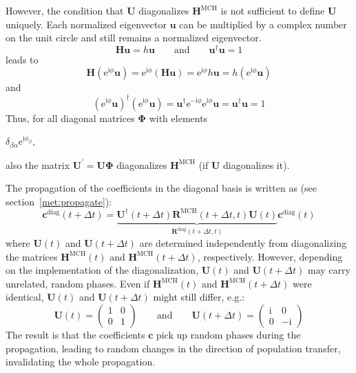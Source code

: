 \documentclass[a4paper,10pt,DIV=15,openany]{scrbook}
\newcommand{\tthdump}[1]{#1}
\newcommand{\E}{\ensuremath{\mathrm{e}}}
\newcommand{\I}{\ensuremath{\mathrm{i}}}
\newcommand{\VEC}[1]{\ensuremath{\mathbf{#1}}}
\begin{document}
However, the condition that $\VEC{U}$ diagonalizes $\VEC{H}^{\text{MCH}}$ is not sufficient to define $\VEC{U}$ uniquely. Each normalized eigenvector $\VEC{u}$ can be multiplied by a complex number on the unit circle and still remains a normalized eigenvector.
\begin{equation}
  \VEC{H}\VEC{u}=h\VEC{u}
  \qquad\text{and}\qquad
  \VEC{u}^\dagger\VEC{u}=1
\end{equation}
leads to
\begin{equation}
  \VEC{H}\left(\E^{\I\phi}\VEC{u}\right)
  =\E^{\I\phi}\left(\VEC{H}\VEC{u}\right)
  =\E^{\I\phi}h\VEC{u}
  =h\left(\E^{\I\phi}\VEC{u}\right)
\end{equation}
and
\begin{equation}
  \left(\E^{\I\phi}\VEC{u}\right)^\dagger\left(\E^{\I\phi}\VEC{u}\right)
  =\VEC{u}^\dagger\E^{-\I\phi}\E^{\I\phi}\VEC{u}
  =\VEC{u}^\dagger\VEC{u}=1
\end{equation}
Thus, for all diagonal matrices $\boldsymbol{\Phi}$ with elements 
\tthdump{
  $\delta_{\beta\alpha}\E^{\I\phi_\beta}$, 
}
also the matrix $\VEC{U}^\prime=\VEC{U}\boldsymbol{\Phi}$ diagonalizes $\VEC{H}^{\text{MCH}}$ (if $\VEC{U}$ diagonalizes it).

The propagation of the coefficients in the diagonal basis is written as (see section~\ref{met:propagate}):
\begin{equation}
  \VEC{c}^{\text{diag}}(t+\Delta t)=\underbrace{\VEC{U}^\dagger(t+\Delta t)\VEC{R}^{\text{MCH}}(t+\Delta t,t)\VEC{U}(t)}_{\VEC{R}^{\text{diag}}(t+\Delta t,t)}\VEC{c}^{\text{diag}}(t)
\end{equation}
where $\VEC{U}(t)$ and $\VEC{U}(t+\Delta t)$ are determined independently from diagonalizing the matrices $\VEC{H}^{\text{MCH}}(t)$ and $\VEC{H}^{\text{MCH}}(t+\Delta t)$, respectively. However, depending on the implementation of the diagonalization, $\VEC{U}(t)$ and $\VEC{U}(t+\Delta t)$ may carry unrelated, random phases. Even if $\VEC{H}^{\text{MCH}}(t)$ and $\VEC{H}^{\text{MCH}}(t+\Delta t)$ were identical, $\VEC{U}(t)$ and $\VEC{U}(t+\Delta t)$ might still differ, e.g.:
\begin{equation}
  \VEC{U}(t)=
  \begin{pmatrix}1&0\\0&1\end{pmatrix}
  \qquad\text{and}\qquad 
  \VEC{U}(t+\Delta t)=
  \begin{pmatrix}\I&0\\0&-\I\end{pmatrix}
\end{equation}
The result is that the coefficients $\VEC{c}$ pick up random phases during the propagation, leading to random changes in the direction of population transfer, invalidating the whole propagation.
\end{document}

